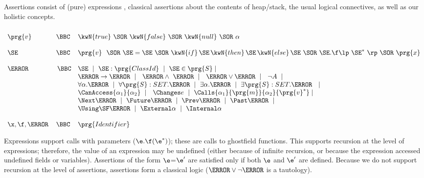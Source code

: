 \begin{definition}[Assertions]  Assertions consist of (pure) expressions \e, classical assertions about the contents of  heap/stack, the usual logical  connectives, as well as our holistic concepts.
\label{def:assertions}
 \[
 \begin{array}{lcl}
  ~  \\
 \prg{v}  &\BBC&    \kwN{true}   ~\SOR~  \kwN{false}   ~\SOR~  \kwN{null}  ~\SOR~  \alpha \\
  ~  \\
 \SE  &\BBC&    \prg{v}\ ~\SOR~ \SE=\SE    ~\SOR~ \kwN{if}\, \SE\,   \kwN{then}\,  \SE\,    \kwN{else}\, \SE    ~\SOR~  \SE.\f\lp\ \SE^* \ \rp ~\SOR~ \prg{x} \\
     \\
 \A &\ \BBC   &   \SE \   \mid \   \SE:\prg{ClassId}  \ \mid \
    \SE\in\prg{S}   \mid  \  \\
    &
  &  \A \rightarrow \A  \ \mid\  \     \A \wedge\ \A  \ \mid\  \  \A \vee \A  \ \mid\  \ \neg A   \ \mid \ \\
  & &  \forall \alpha.\A  \ \mid \  \forall \prg{S}:SET.\A  \ \mid  \  \exists \alpha.\A  \ \mid \  \exists \prg{S}:SET.\A  \  \ \mid \\
 &    &  \CanAccess {\alpha_1} {\alpha_2} \ \mid\  \ \Changes e 
           \ \mid\  \Calls {\alpha_1}  {\prg{m}} {\alpha_2}  {\prg{v}^*}\mid\\          
&    &  \Next \A  \ \mid \   \Future \A \ \mid \  \Prev \A   \ \mid \ \Past \A \ \mid \\  
 &    &        \Using \SF  \A  \ \mid \  \External \alpha\ \mid \  \Internal \alpha\\
 \\
 \x, \f, \m &\BBC&  \prg{Identifier}  ~ \\
\end{array}
\]
\end{definition}
\jm[added $\Internal \alpha$, removed $e = e$]{}
 
Expressions support calls with parameters  ($\e.\f(\e^*)$); these are calls to ghostfield
functions. This  supports recursion at the level of expressions; therefore, the value of  an expression  may be
undefined (either because of infinite recursion, or because the expression accessed undefined fields or variables). 
Assertions of the form   $\e$=$\e'$ are satisfied only if both $\e$ and $\e'$ are defined. Because we do not support 
recursion at the level of assertions, assertions form a classical logic (\eg $\A \vee \neg\A$ is a tautology).
 
